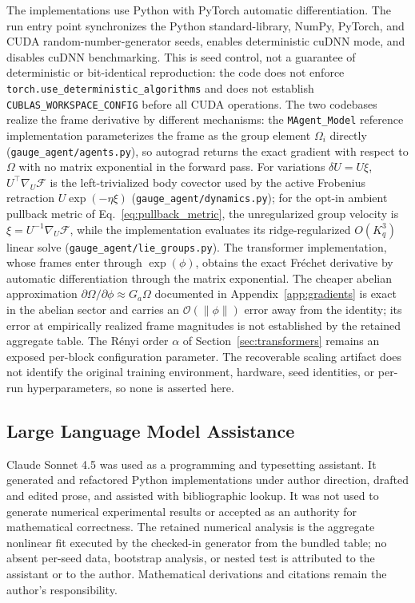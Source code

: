 \documentclass[11pt]{article}
\begin{document}
The implementations use Python with PyTorch automatic differentiation. The run entry point synchronizes the Python standard-library, NumPy, PyTorch, and CUDA random-number-generator seeds, enables deterministic cuDNN mode, and disables cuDNN benchmarking. This is seed control, not a guarantee of deterministic or bit-identical reproduction: the code does not enforce \texttt{torch.use\_deterministic\_algorithms} and does not establish \texttt{CUBLAS\_WORKSPACE\_CONFIG} before all CUDA operations. The two codebases realize the frame derivative by different mechanisms: the \texttt{MAgent\_Model} reference implementation parameterizes the frame as the group element $\Omega_i$ directly (\texttt{gauge\_agent/agents.py}), so autograd returns the exact gradient with respect to $\Omega$ with no matrix exponential in the forward pass. For variations $\delta U=U\xi$, $U^\top\nabla_U\mathcal{F}$ is the left-trivialized body covector used by the active Frobenius retraction $U\exp(-\eta\xi)$ (\texttt{gauge\_agent/dynamics.py}); for the opt-in ambient pullback metric of Eq.~\eqref{eq:pullback_metric}, the unregularized group velocity is $\xi=U^{-1}\nabla_U\mathcal{F}$, while the implementation evaluates its ridge-regularized $O(K_q^3)$ linear solve (\texttt{gauge\_agent/lie\_groups.py}). The transformer implementation, whose frames enter through $\exp(\phi)$, obtains the exact Fr\'echet derivative by automatic differentiation through the matrix exponential. The cheaper abelian approximation $\partial\Omega/\partial\phi \approx G_a\Omega$ documented in Appendix~\ref{app:gradients} is exact in the abelian sector and carries an $\mathcal{O}(\|\phi\|)$ error away from the identity; its error at empirically realized frame magnitudes is not established by the retained aggregate table. The R\'enyi order $\alpha$ of Section~\ref{sec:transformers} remains an exposed per-block configuration parameter. The recoverable scaling artifact does not identify the original training environment, hardware, seed identities, or per-run hyperparameters, so none is asserted here.

\subsection{Large Language Model Assistance}

Claude Sonnet 4.5 was used as a programming and typesetting assistant. It generated and refactored Python implementations under author direction, drafted and edited prose, and assisted with bibliographic lookup. It was not used to generate numerical experimental results or accepted as an authority for mathematical correctness. The retained numerical analysis is the aggregate nonlinear fit executed by the checked-in generator from the bundled table; no absent per-seed data, bootstrap analysis, or nested test is attributed to the assistant or to the author. Mathematical derivations and citations remain the author's responsibility.
\end{document}
